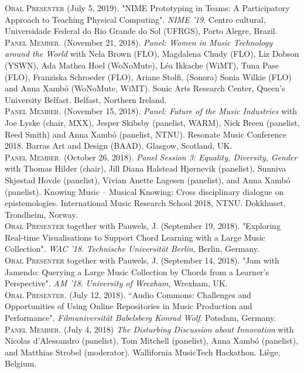 \documentclass[10pt, a4paper]{article}
\newcommand{\years}[1]{\marginnote{\scriptsize #1}}
\begin{document}
{\years{2019a} \textsc{Oral Presenter} (July 5, 2019). "NIME Prototyping in Teams: A Participatory Approach to Teaching Physical Computing". \emph{NIME '19}. Centro cultural, Universidade Federal do Rio Grande do Sol (UFRGS), Porto Alegre, Brazil.\\
\years{2018j}\textsc{Panel Member}. (November 21, 2018). \emph{Panel: Women in Music Technology around the World} with Nela Brown (FLO), Magdalena Chudy (FLO), Liz Dobson (YSWN), Ada Mathea Hoel (WoNoMute), Léa Ikkache (WiMT), Tuna Pase (FLO), Franziska Schroeder (FLO), Ariane Stolfi, (Sonora) Sonia Wilkie (FLO) and Anna Xambó (WoNoMute, WiMT). Sonic Arts Research Center, Queen's University Belfast. Belfast, Northern Ireland.\\
\years{2018i}\textsc{Panel Member}. (November 15, 2018). \emph{Panel: Future of the Music Industries} with Joe Lyske (chair, MXX), Jesper Skibsby (panelist, WARM), Nick Breen (panelist, Reed Smith) and Anna Xambó (panelist, NTNU). Resonate Music Conference 2018. Barras Art and Design (BAAD), Glasgow, Scotland, UK.\\
\years{2018h}\textsc{Panel Member}. (October 26, 2018). \emph{Panel Session 3: Equality, Diversity, Gender} with Thomas Hilder (chair), Jill Diana Halstead Hjørnevik (panelist), Sunniva Skjøstad Hovde (panelist), Vivian Anette Lagesen (panelist), and Anna Xambó (panelist). Knowing Music -- Musical Knowing: Cross disciplinary dialogue on epistemologies. International Music Research School 2018, NTNU. Dokkhuset, Trondheim, Norway.\\
\years{2018g} \textsc{Oral Presenter} together with Pauwels, J.  (September 19, 2018). "Exploring Real-time Visualisations to Support Chord Learning with a Large Music Collection". \emph{WAC '18}. \emph{Technische Universität Berlin}, Berlin, Germany.\\
\years{2018f} \textsc{Oral Presenter} together with Pauwels, J. (September 14, 2018). "Jam with Jamendo: Querying a Large Music Collection by Chords from a Learner’s Perspective". \emph{AM '18}. \emph{University of Wrexham}, Wrexham, UK.\\
\years{2018e} \textsc{Oral Presenter}. (July 12, 2018). “Audio Commons: Challenges and Opportunities of Using Online Repositories in Music Production and Performance". \emph{Filmuniversität Babelsberg Konrad Wolf}. Potsdam, Germany.\\
\years{2018d}\textsc{Panel Member}. (July 4, 2018) \emph{The Disturbing Discussion about Innovation} with Nicolas d'Alessandro (panelist), Tom Mitchell (panelist), Anna Xambó (panelist), and Matthias Strobel (moderator). Wallifornia MusicTech Hackathon. Liège, Belgium.\\
}
\end{document}
